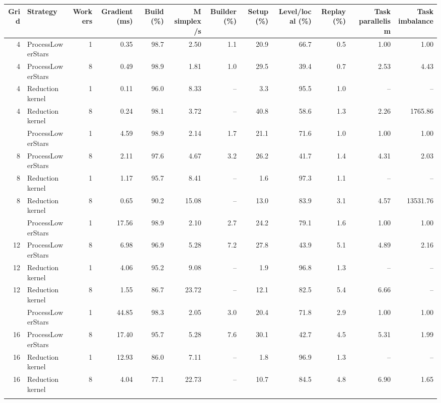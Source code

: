 \begin{tabular}{rlrrrrrrrrrr}
\toprule
Grid & Strategy & Workers & Gradient (ms) & Build (\%) & M simplex/s & Builder (\%) & Setup (\%) & Level/local (\%) & Replay (\%) & Task parallelism & Task imbalance \\
\midrule
4 & ProcessLowerStars & 1 & 0.35 & 98.7 & 2.50 & 1.1 & 20.9 & 66.7 & 0.5 & 1.00 & 1.00 \\
4 & ProcessLowerStars & 8 & 0.49 & 98.9 & 1.81 & 1.0 & 29.5 & 39.4 & 0.7 & 2.53 & 4.43 \\
4 & Reduction kernel & 1 & 0.11 & 96.0 & 8.33 & -- & 3.3 & 95.5 & 1.0 & -- & -- \\
4 & Reduction kernel & 8 & 0.24 & 98.1 & 3.72 & -- & 40.8 & 58.6 & 1.3 & 2.26 & 1765.86 \\
\addlinespace
8 & ProcessLowerStars & 1 & 4.59 & 98.9 & 2.14 & 1.7 & 21.1 & 71.6 & 1.0 & 1.00 & 1.00 \\
8 & ProcessLowerStars & 8 & 2.11 & 97.6 & 4.67 & 3.2 & 26.2 & 41.7 & 1.4 & 4.31 & 2.03 \\
8 & Reduction kernel & 1 & 1.17 & 95.7 & 8.41 & -- & 1.6 & 97.3 & 1.1 & -- & -- \\
8 & Reduction kernel & 8 & 0.65 & 90.2 & 15.08 & -- & 13.0 & 83.9 & 3.1 & 4.57 & 13531.76 \\
\addlinespace
12 & ProcessLowerStars & 1 & 17.56 & 98.9 & 2.10 & 2.7 & 24.2 & 79.1 & 1.6 & 1.00 & 1.00 \\
12 & ProcessLowerStars & 8 & 6.98 & 96.9 & 5.28 & 7.2 & 27.8 & 43.9 & 5.1 & 4.89 & 2.16 \\
12 & Reduction kernel & 1 & 4.06 & 95.2 & 9.08 & -- & 1.9 & 96.8 & 1.3 & -- & -- \\
12 & Reduction kernel & 8 & 1.55 & 86.7 & 23.72 & -- & 12.1 & 82.5 & 5.4 & 6.66 & -- \\
\addlinespace
16 & ProcessLowerStars & 1 & 44.85 & 98.3 & 2.05 & 3.0 & 20.4 & 71.8 & 2.9 & 1.00 & 1.00 \\
16 & ProcessLowerStars & 8 & 17.40 & 95.7 & 5.28 & 7.6 & 30.1 & 42.7 & 4.5 & 5.31 & 1.99 \\
16 & Reduction kernel & 1 & 12.93 & 86.0 & 7.11 & -- & 1.8 & 96.9 & 1.3 & -- & -- \\
16 & Reduction kernel & 8 & 4.04 & 77.1 & 22.73 & -- & 10.7 & 84.5 & 4.8 & 6.90 & 1.65 \\
\addlinespace
\bottomrule
\end{tabular}
